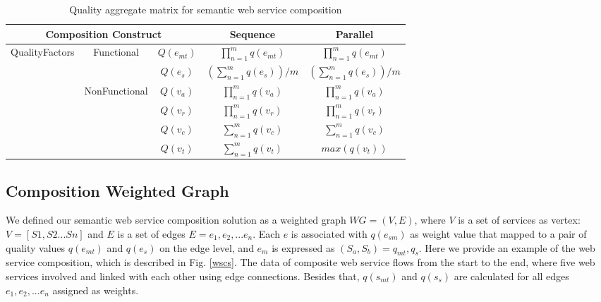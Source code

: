 \documentclass{llncs}
\begin{document}
\begin{table}[]
\centering
\caption{Quality aggregate matrix for semantic web service composition}
\label{table1}
\begin{tabular}{c|c|c|c|c}
\hline
\multicolumn{3}{c|}{Composition Construct}                                      & Sequence                             & Parallel \\ \hline
\multirow{5}{*}{QualityFactors} & \multirow{2}{*}{Functional}    & $Q(e_ {mt})$  &$\prod_{n=1}^{m} q(e_ {mt})$          &  $\prod_{n=1}^{m} q(e_ {mt})$ \\ \cline{3-5}
                                &                                & $Q(e_ {s})$  & $(\sum_{n=1}^m q(e_ {s}))/m$        &  $(\sum_{n=1}^m q(e_ {s}))/m$  \\ \cline{2-5}   
                                & \multirow{4}{*}{NonFunctional} & $Q(v_{a})$    & $\prod_{n=1}^{m} q(v_a)$             &  $\prod_{n=1}^{m} q(v_a)$ \\ \cline{3-5} 
                                &                                & $Q(v_{r})$    & $\prod_{n=1}^{m} q(v_r)$             &  $\prod_{n=1}^{m} q(v_r)$ \\ \cline{3-5} 
                                &                                & $Q(v_{c})$    & $\sum_{n=1}^m q(v_ {c})$             &  $\sum_{n=1}^m q(v_ {c})$ \\ \cline{3-5} 
                                &                                & $Q(v_{t})$    & $\sum_{n=1}^m q(v_ {t})$             &  $max(q(v_ {t}))$ \\ \hline
\end{tabular}
\end{table}



\subsection{Composition Weighted Graph}
We defined our semantic web service composition solution as a weighted graph $WG = (V, E)$, where $V$ is a set of services as vertex: $V=[S1, S2...Sn]$ and $E$ is a set of edges $E = {e_{1}, e_{2},... e_{n}}$. Each $e$ is associated with $q(e_{sm})$ as weight value that mapped to a pair of quality values $q(e_{mt})$ and $q(e_{s})$ on the edge level, and $e_{m}$ is expressed as $(S_{a},S_{b})={q_{mt}, q_{s}}$. Here we provide an example of the web service composition, which is described in Fig. \ref{wscs}. The data of composite web service flows from the start to the end, where five web services involved and linked with each other using edge connections. Besides that, $q(s_{mt})$ and $q(s_{s})$ are calculated for all edges ${e_{1}, e_{2},... e_{n}}$ assigned as weights.
\end{document}
